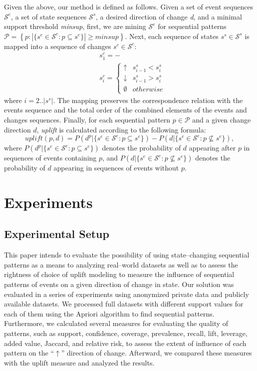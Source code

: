 \documentclass[runningheads,a4paper]{llncs}
\begin{document}
Given the above, our method is defined as follows.
Given a set of event sequences $\mathcal{S}^e$, a set of state sequences $\mathcal{S}^s$, a desired direction of change \textit{d}, and a minimal support threshold \textit{minsup}, first, we are mining $\mathcal{S}^e$ for sequential patterns $\mathcal{P}=\left\{p:|\{s^e\in\mathcal{S}^e:p\subseteq s^e\}|\geq\textit{minsup}\right\}$.
Next, each sequence of states $s^s\in\mathcal{S}^s$ is mapped into a sequence of changes $s^c\in\mathcal{S}^c$:
\begin{equation*}
\begin{split}
&s^c_1=-\\
&s^c_i=\begin{cases}
	\uparrow & s^s_{i-1}<s^s_i \\
	\downarrow & s^s_{i-1}>s^s_i \\
	\emptyset & otherwise
\end{cases}
\end{split}
\end{equation*}
where $i=2..|s^s|$.
The mapping preserves the correspondence relation with the events sequence and the total order of the combined elements of the events and changes sequences.
Finally, for each sequential pattern $p\in\mathcal{P}$ and a given change direction $d$, \textit{uplift} is calculated according to the following formula:
\begin{equation*}
\textit{uplift}(p,d)=P(d^p|\{s^e\in\mathcal{S}^e:p\subseteq s^e\})-P(d|\{s^e\in\mathcal{S}^e:p\not\subseteq s^e\}),
\end{equation*}
where $P(d^p|\{s^e\in\mathcal{S}^e:p\subseteq s^e\})$ denotes the probability of $d$ appearing after $p$ in sequences of events containing $p$, and $P(d|\{s^e\in\mathcal{S}^e:p\not\subseteq s^e\})$ denotes the probability of $d$ appearing in sequences of events without $p$.

\section{Experiments}
\label{sec:experiments}
\subsection{Experimental Setup}
This paper intends to evaluate the possibility of using state--changing sequential patterns as a means to analyzing real--world datasets as well as to assess the rightness of choice of uplift modeling to measure the influence of sequential patterns of events on a given direction of change in state.
Our solution was evaluated in a series of experiments using anonymized private data and publicly available datasets.
We processed full datasets with different support values for each of them using the Apriori algorithm to find sequential patterns.
Furthermore, we calculated several measures for evaluating the quality of patterns, such as support, confidence, coverage, prevalence, recall, lift, leverage, added value, Jaccard, and relative risk, to assess the extent of influence of each pattern on the ``$\uparrow$'' direction of change.
Afterward, we compared these measures with the uplift measure and analyzed the results. 
\end{document}
